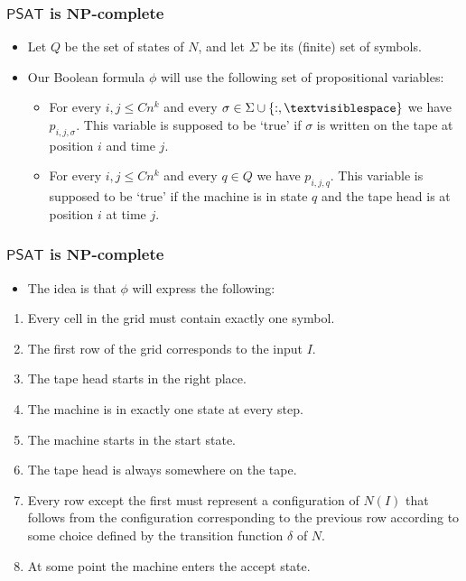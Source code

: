 \documentclass[handout]{beamer}
\newcommand{\tvs}{\textvisiblespace}
\newcommand{\NP}{\mathbf{NP}}
\newcommand{\SAT}{\mathsf{PSAT}}
\begin{document}
\begin{frame}
\frametitle{$\SAT$ is $\NP$-complete}
\begin{itemize}
\item Let $Q$ be the set of states of $N$, and let $\Sigma$ be its (finite) set of symbols. 
\vspace{0.3cm}
\item Our Boolean formula $\phi$ will use the following set of propositional variables:  
\vspace{0.3cm}
\begin{itemize}
\item For every $i,j\leq Cn^k$ and every $\sigma\in \Sigma\cup\{:,\tvs\}$ we have $p_{i,j,\sigma}$. This variable is supposed to be `true' if $\sigma$ is written on the tape at position $i$ and time $j$.  
\vspace{0.3cm}
\item For every $i,j\leq Cn^k$ and every $q\in Q$ we have $p_{i,j,q}$. This variable is supposed to be `true' if the machine is in state $q$ and the tape head is at position $i$ at time $j$.
\end{itemize}
\end{itemize} 
\end{frame}

\begin{frame}
\frametitle{$\SAT$ is $\NP$-complete}
\begin{itemize}
\item The idea is that $\phi$ will express the following:
\end{itemize} 
\begin{enumerate}
\item Every cell in the grid must contain exactly one symbol. 
\item The first row of the grid corresponds to the input $I$.
\item The tape head starts in the right place.
\item The machine is in exactly one state at every step.
\item The machine starts in the start state.
\item The tape head is always somewhere on the tape. 
\item Every row except the first must represent a configuration of $N(I)$ that follows from the configuration corresponding to the previous row according to some choice defined by the transition function $\delta$ of $N$.
\item At some point the machine enters the accept state.
\end{enumerate}
\end{frame}
\end{document}
